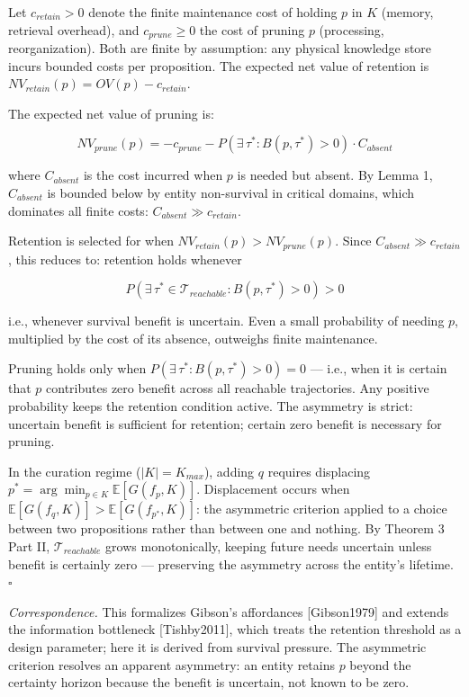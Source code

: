 \documentclass[
]{article}
\begin{document}
Let \(c_{retain} > 0\) denote the finite maintenance cost of holding
\(p\) in \(K\) (memory, retrieval overhead), and \(c_{prune} \geq 0\)
the cost of pruning \(p\) (processing, reorganization). Both are finite
by assumption: any physical knowledge store incurs bounded costs per
proposition. The expected net value of retention is
\(NV_{retain}(p) = OV(p) - c_{retain}\).

The expected net value of pruning is:

\[NV_{prune}(p) = -c_{prune} - P\!\left(\exists\,\tau^* : B(p,\tau^*) > 0\right) \cdot C_{absent}\]

where \(C_{absent}\) is the cost incurred when \(p\) is needed but
absent. By Lemma 1, \(C_{absent}\) is bounded below by entity
non-survival in critical domains, which dominates all finite costs:
\(C_{absent} \gg c_{retain}\).

Retention is selected for when \(NV_{retain}(p) > NV_{prune}(p)\). Since
\(C_{absent} \gg
c_{retain}\), this reduces to: retention holds whenever

\[P\!\left(\exists\,\tau^* \in \mathcal{T}_{reachable} : B(p,\tau^*) > 0\right) > 0\]

i.e., whenever survival benefit is uncertain. Even a small probability
of needing \(p\), multiplied by the cost of its absence, outweighs
finite maintenance.

Pruning holds only when \(P(\exists\,\tau^* : B(p,\tau^*) > 0) = 0\) ---
i.e., when it is certain that \(p\) contributes zero benefit across all
reachable trajectories. Any positive probability keeps the retention
condition active. The asymmetry is strict: uncertain benefit is
sufficient for retention; certain zero benefit is necessary for pruning.

In the curation regime (\(|K| = K_{max}\)), adding \(q\) requires
displacing \(p^* = \arg\min_{p \in K} \mathbb{E}[G(f_p, K)]\).
Displacement occurs when
\(\mathbb{E}[G(f_q, K)] > \mathbb{E}[G(f_{p^*}, K)]\): the asymmetric
criterion applied to a choice between two propositions rather than
between one and nothing. By Theorem 3 Part II,
\(\mathcal{T}_{reachable}\) grows monotonically, keeping future needs
uncertain unless benefit is certainly zero --- preserving the asymmetry
across the entity's lifetime. \(\square\)

\emph{Correspondence.} This formalizes Gibson's affordances
{[}Gibson1979{]} and extends the information bottleneck
{[}Tishby2011{]}, which treats the retention threshold as a design
parameter; here it is derived from survival pressure. The asymmetric
criterion resolves an apparent asymmetry:
an entity retains \(p\) beyond the certainty horizon because the
benefit is uncertain, not known to be zero.
\end{document}
